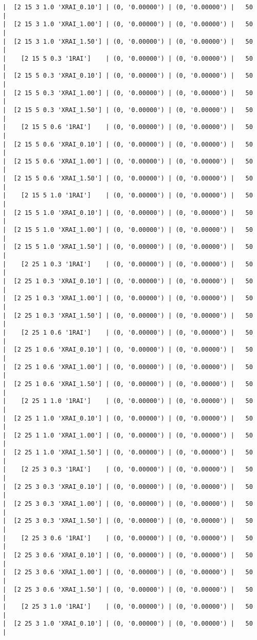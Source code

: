 \documentclass{article}
\begin{document}
\begin{verbatim}
|  [2 15 3 1.0 'XRAI_0.10'] | (0, '0.00000') | (0, '0.00000') |   50  |
|  [2 15 3 1.0 'XRAI_1.00'] | (0, '0.00000') | (0, '0.00000') |   50  |
|  [2 15 3 1.0 'XRAI_1.50'] | (0, '0.00000') | (0, '0.00000') |   50  |
|    [2 15 5 0.3 '1RAI']    | (0, '0.00000') | (0, '0.00000') |   50  |
|  [2 15 5 0.3 'XRAI_0.10'] | (0, '0.00000') | (0, '0.00000') |   50  |
|  [2 15 5 0.3 'XRAI_1.00'] | (0, '0.00000') | (0, '0.00000') |   50  |
|  [2 15 5 0.3 'XRAI_1.50'] | (0, '0.00000') | (0, '0.00000') |   50  |
|    [2 15 5 0.6 '1RAI']    | (0, '0.00000') | (0, '0.00000') |   50  |
|  [2 15 5 0.6 'XRAI_0.10'] | (0, '0.00000') | (0, '0.00000') |   50  |
|  [2 15 5 0.6 'XRAI_1.00'] | (0, '0.00000') | (0, '0.00000') |   50  |
|  [2 15 5 0.6 'XRAI_1.50'] | (0, '0.00000') | (0, '0.00000') |   50  |
|    [2 15 5 1.0 '1RAI']    | (0, '0.00000') | (0, '0.00000') |   50  |
|  [2 15 5 1.0 'XRAI_0.10'] | (0, '0.00000') | (0, '0.00000') |   50  |
|  [2 15 5 1.0 'XRAI_1.00'] | (0, '0.00000') | (0, '0.00000') |   50  |
|  [2 15 5 1.0 'XRAI_1.50'] | (0, '0.00000') | (0, '0.00000') |   50  |
|    [2 25 1 0.3 '1RAI']    | (0, '0.00000') | (0, '0.00000') |   50  |
|  [2 25 1 0.3 'XRAI_0.10'] | (0, '0.00000') | (0, '0.00000') |   50  |
|  [2 25 1 0.3 'XRAI_1.00'] | (0, '0.00000') | (0, '0.00000') |   50  |
|  [2 25 1 0.3 'XRAI_1.50'] | (0, '0.00000') | (0, '0.00000') |   50  |
|    [2 25 1 0.6 '1RAI']    | (0, '0.00000') | (0, '0.00000') |   50  |
|  [2 25 1 0.6 'XRAI_0.10'] | (0, '0.00000') | (0, '0.00000') |   50  |
|  [2 25 1 0.6 'XRAI_1.00'] | (0, '0.00000') | (0, '0.00000') |   50  |
|  [2 25 1 0.6 'XRAI_1.50'] | (0, '0.00000') | (0, '0.00000') |   50  |
|    [2 25 1 1.0 '1RAI']    | (0, '0.00000') | (0, '0.00000') |   50  |
|  [2 25 1 1.0 'XRAI_0.10'] | (0, '0.00000') | (0, '0.00000') |   50  |
|  [2 25 1 1.0 'XRAI_1.00'] | (0, '0.00000') | (0, '0.00000') |   50  |
|  [2 25 1 1.0 'XRAI_1.50'] | (0, '0.00000') | (0, '0.00000') |   50  |
|    [2 25 3 0.3 '1RAI']    | (0, '0.00000') | (0, '0.00000') |   50  |
|  [2 25 3 0.3 'XRAI_0.10'] | (0, '0.00000') | (0, '0.00000') |   50  |
|  [2 25 3 0.3 'XRAI_1.00'] | (0, '0.00000') | (0, '0.00000') |   50  |
|  [2 25 3 0.3 'XRAI_1.50'] | (0, '0.00000') | (0, '0.00000') |   50  |
|    [2 25 3 0.6 '1RAI']    | (0, '0.00000') | (0, '0.00000') |   50  |
|  [2 25 3 0.6 'XRAI_0.10'] | (0, '0.00000') | (0, '0.00000') |   50  |
|  [2 25 3 0.6 'XRAI_1.00'] | (0, '0.00000') | (0, '0.00000') |   50  |
|  [2 25 3 0.6 'XRAI_1.50'] | (0, '0.00000') | (0, '0.00000') |   50  |
|    [2 25 3 1.0 '1RAI']    | (0, '0.00000') | (0, '0.00000') |   50  |
|  [2 25 3 1.0 'XRAI_0.10'] | (0, '0.00000') | (0, '0.00000') |   50  |

\end{verbatim}
\end{document}

